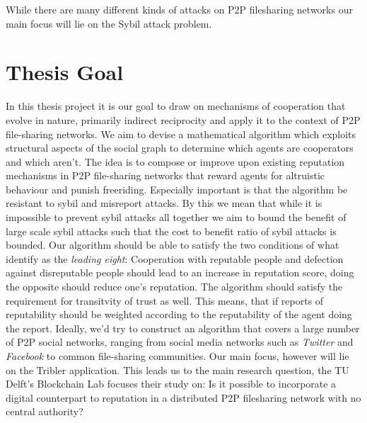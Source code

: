 \documentclass[11pt,a4paper]{article}
\theoremstyle{definition}
\theoremstyle{theorem}
\theoremstyle{proposition}
\theoremstyle{corollary}
\theoremstyle{lemma}
\theoremstyle{example}
\theoremstyle{remark}
\begin{document}
\noindent{}While there are many different kinds of attacks on P2P filesharing networks our main focus will lie on the Sybil attack problem.\vspace{1em}\\

\section{Thesis Goal}
\label{sec:Thesis Goal}
In this thesis project it is our goal to draw on mechanisms of cooperation that evolve in nature, primarily indirect reciprocity and apply it to the context of P2P file-sharing networks. We aim to devise a mathematical algorithm which exploits structural aspects of the social graph to determine which agents are cooperators and which aren't. The idea is to compose or improve upon existing reputation mechanisms in P2P file-sharing networks that reward agents for altruistic behaviour and punish freeriding. Especially important is that the algorithm be resistant to sybil and misreport attacks. By this we mean that while it is impossible to prevent sybil attacks all together we aim to bound the benefit of large scale sybil attacks such that the cost to benefit ratio of sybil attacks is bounded. Our algorithm should be able to satisfy the two conditions of what \cite{How Should We Define Goodness} identify as the {\it leading eight}: Cooperation with reputable people and defection against disreputable people should lead to an increase in reputation score, doing the opposite should reduce one's reputation. The algorithm should satisfy the requirement for transitvity of trust as well. This means, that if reports of reputability should be weighted according to the reputability of the agent doing the report. Ideally, we'd try to construct an algorithm that covers a large number of P2P social networks, ranging from social media networks such as {\it Twitter} and {\it Facebook} to common file-sharing communities. Our main focus, however will lie on the Tribler application. This leads us to the main research question, the TU Delft's Blockchain Lab focuses their study on: Is it possible to incorporate a digital counterpart to reputation in a distributed P2P filesharing network with no central authority? \vspace{1em}\\
\end{document}
